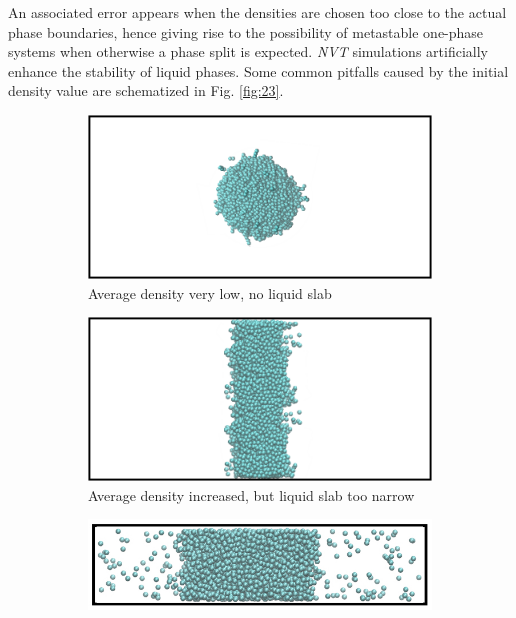 \documentclass[9pt,bestpractices]{livecoms}
\begin{document}
An associated error appears when the densities are chosen too close to the
actual phase boundaries, hence giving rise to the possibility of metastable
one-phase systems when otherwise a phase split is expected. \textit{NVT}
simulations artificially enhance the stability of liquid phases. Some common
pitfalls caused by the initial density value are schematized in Fig. \ref{fig:23}.


\begin{figure}
	\centering
	\begin{subfigure}{0.3\textwidth} %
    \includegraphics[width=1\textwidth]{gfx/Fig_23_a.png}
    \caption{Average density very low, no liquid slab}
	\end{subfigure}
	\begin{subfigure}{0.3\textwidth} %
    \includegraphics[width=1\textwidth]{gfx/Fig_23_b.png}
    \caption{Average density increased, but liquid slab too narrow}
	\end{subfigure}
	\begin{subfigure}{0.3\textwidth} %
    \includegraphics[width=1\textwidth]{gfx/Fig_23c.jpeg}

\end{subfigure}
\end{figure}
\end{document}
